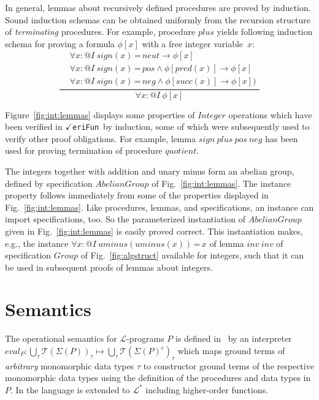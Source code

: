 \documentclass{article}
\theoremstyle{remark}
\theoremstyle{definition}
\newcommand{\VeriFun}{\mbox{{\Large $\checkmark $}\hspace{-0.21cm}\texttt{eriFun}}}
\newcommand{\vflang}{\ensuremath{\mathcal{L}}}
\newcommand{\ieq}{\,\texttt{=}\,}
\newcommand{\name}[1]{\mathit{#1}}
\newcommand{\evalP}{\mathit{eval}_P}
\newcommand{\terms}{\mathcal{T}}
\begin{document}
In general, lemmas about recursively defined procedures are proved by induction. Sound induction schemas can be
obtained uniformly from the recursion structure of \emph{terminating} procedures. For example, procedure $\name{plus}$
yields following induction schema for proving a formula $\phi[x]$ with a free integer variable~$x$:
\begin{equation*}
\frac{\begin{aligned}
&\forall x:@I\ \name{sign}(x)\ieq\name{neut} \rightarrow \phi[x] \\
&\forall x:@I\ \name{sign}(x)\ieq\name{pos} \wedge \phi[\name{pred}(x)] \rightarrow \phi[x] \\
&\forall x:@I\ \name{sign}(x)\ieq\name{neg} \wedge \phi[\name{succ}(x)] \rightarrow \phi[x] )
\end{aligned} }{\forall x:@I\ \phi[x]}
\end{equation*}

Figure~\ref{fig:int:lemmas} displays some properties of $\name{Integer}$ operations which have been verified in
\VeriFun\ by induction, some of which were subsequently used to verify other proof obligations. For example, lemma
$\name{sign}\ \name{plus}\ \name{pos}\ \name{neg}$ has been used for proving termination of procedure
$\name{quotient}$.

The integers together with addition and unary minus form an abelian group, defined by specification
$\name{AbelianGroup}$ of Fig.~\ref{fig:int:lemmas}. The instance property follows immediately from some of the
properties displayed in Fig.~\ref{fig:int:lemmas}. Like procedures, lemmas, and specifications, an instance can import
specifications, too. So the parameterized instantiation of $\name{AbelianGroup}$ given in Fig.~\ref{fig:int:lemmas} is
easily proved correct. This instantiation makes, e.g., the instance $\forall x:@I\ \name{uminus}(\name{uminus}(x))\ieq
x$ of lemma $\name{inv}\ \name{inv}$ of specification $\name{Group}$ of Fig.~\ref{fig:algstruct} available for
integers, such that it can be used in subsequent proofs of lemmas about integers.

\section{Semantics}\label{sec:semantics}

The operational semantics for \vflang-programs $P$ is defined in~\cite{S:Diss,ASW:LPrimer} by an interpreter $\evalP:
\bigcup_\tau \terms(\Sigma(P))_\tau \mapsto \bigcup_\tau \terms(\Sigma(P)^c)_\tau$ which maps ground terms of
\emph{arbitrary} monomorphic data types $\tau$ to constructor ground terms of the respective monomorphic data types
using the definition of the procedures and data types in $P$. In \cite{A:HOinVF} the language is extended to
$\vflang^*$ including higher-order functions.
\end{document}
